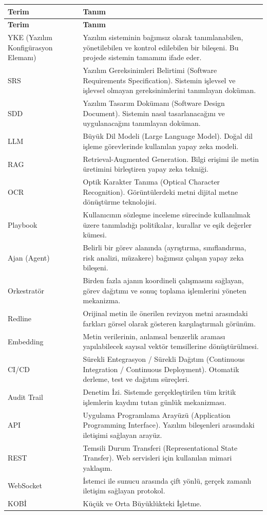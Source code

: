 \documentclass[12pt, a4paper]{article}
\begin{document}
\begin{longtable}{|p{4.5cm}|p{9cm}|}
\hline
\textbf{Terim} & \textbf{Tanım} \\
\hline
\endfirsthead
\hline
\textbf{Terim} & \textbf{Tanım} \\
\hline
\endhead
YKE (Yazılım Konfigürasyon Elemanı) & Yazılım sisteminin bağımsız olarak tanımlanabilen, yönetilebilen ve kontrol edilebilen bir bileşeni. Bu projede sistemin tamamını ifade eder. \\
\hline
SRS & Yazılım Gereksinimleri Belirtimi (Software Requirements Specification). Sistemin işlevsel ve işlevsel olmayan gereksinimlerini tanımlayan doküman. \\
\hline
SDD & Yazılım Tasarım Dokümanı (Software Design Document). Sistemin nasıl tasarlanacağını ve uygulanacağını tanımlayan doküman. \\
\hline
LLM & Büyük Dil Modeli (Large Language Model). Doğal dil işleme görevlerinde kullanılan yapay zeka modeli. \\
\hline
RAG & Retrieval-Augmented Generation. Bilgi erişimi ile metin üretimini birleştiren yapay zeka tekniği. \\
\hline
OCR & Optik Karakter Tanıma (Optical Character Recognition). Görüntülerdeki metni dijital metne dönüştürme teknolojisi. \\
\hline
Playbook & Kullanıcının sözleşme inceleme sürecinde kullanılmak üzere tanımladığı politikalar, kurallar ve eşik değerler kümesi. \\
\hline
Ajan (Agent) & Belirli bir görev alanında (ayrıştırma, sınıflandırma, risk analizi, müzakere) bağımsız çalışan yapay zeka bileşeni. \\
\hline
Orkestratör & Birden fazla ajanın koordineli çalışmasını sağlayan, görev dağıtımı ve sonuç toplama işlemlerini yöneten mekanizma. \\
\hline
Redline & Orijinal metin ile önerilen revizyon metni arasındaki farkları görsel olarak gösteren karşılaştırmalı görünüm. \\
\hline
Embedding & Metin verilerinin, anlamsal benzerlik araması yapılabilecek sayısal vektör temsillerine dönüştürülmesi. \\
\hline
CI/CD & Sürekli Entegrasyon / Sürekli Dağıtım (Continuous Integration / Continuous Deployment). Otomatik derleme, test ve dağıtım süreçleri. \\
\hline
Audit Trail & Denetim İzi. Sistemde gerçekleştirilen tüm kritik işlemlerin kaydını tutan günlük mekanizması. \\
\hline
API & Uygulama Programlama Arayüzü (Application Programming Interface). Yazılım bileşenleri arasındaki iletişimi sağlayan arayüz. \\
\hline
REST & Temsili Durum Transferi (Representational State Transfer). Web servisleri için kullanılan mimari yaklaşım. \\
\hline
WebSocket & İstemci ile sunucu arasında çift yönlü, gerçek zamanlı iletişim sağlayan protokol. \\
\hline
KOBİ & Küçük ve Orta Büyüklükteki İşletme. \\
\hline
\end{longtable}
\end{document}
